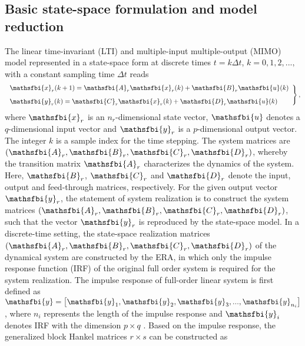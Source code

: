 \documentclass{jfm}
\begin{document}
\subsection{Basic state-space formulation and model reduction}
The linear time-invariant (LTI) and multiple-input multiple-output (MIMO) model represented in a state-space form 
at discrete times $t=k\Delta t$, 
$k=0,1,2,...,$ with a constant sampling time $\Delta t$ reads 
\begin{equation}
\left. \begin{array}{ll}

\displaystyle \mathsfbi{x}_{r}(k+1)=\mathsfbi{A}_{r}\mathsfbi{x}_{r}(k)+\mathsfbi{B}_{r}\mathsfbi{u}(k)  \\[8pt]

\displaystyle \mathsfbi{y}_{r}(k)=\mathsfbi{C}_{r}\mathsfbi{x}_{r}(k)+\mathsfbi{D}_{r}\mathsfbi{u}(k) 
\end{array}\right\},
 \label{eq:ERA_ROM}
\end{equation}  
where $\mathsfbi{x}_r$ is an $n_r$-dimensional state vector, 
$\mathsfbi{u}$ denotes a $q$-dimensional input vector 
and $\mathsfbi{y}_r$ is a $p$-dimensional output vector.  
The integer $k$ is a sample index for the time stepping.
%
The system matrices are $\left(\mathsfbi{A}_r,\mathsfbi{B}_r,\mathsfbi{C}_r,\mathsfbi{D}_r\right)$, 
whereby the transition matrix $\mathsfbi{A}_r$ characterizes the dynamics of the system.
Here, $\mathsfbi{B}_r$, 
$\mathsfbi{C}_r$ and $\mathsfbi{D}_r$ denote the input, output and 
feed-through matrices, respectively. 
For the given output vector $\mathsfbi{y}_r$, the statement of system realization 
is to construct the system matrices $\left(\mathsfbi{A}_r,\mathsfbi{B}_r,\mathsfbi{C}_r,\mathsfbi{D}_r \right)$,
such that the vector $\mathsfbi{y}_r$ is reproduced by the state-space model.
In a discrete-time setting,
the state-space realization matrices $\left(\mathsfbi{A}_{r},\mathsfbi{B}_{r},\mathsfbi{C}_{r},\mathsfbi{D}_{r} \right)$ 
of the dynamical system are constructed by the ERA, 
in which only the impulse response function (IRF) of the original full order system 
is required for the system realization. The impulse response of full-order linear system is 
first defined as 
$\mathsfbi{y}=\left[\mathsfbi{y}_1,\mathsfbi{y}_2,\mathsfbi{y}_3,...,\mathsfbi{y}_{n_i}\right]$, 
where $n_i$ represents the length of the impulse response 
and $\mathsfbi{y}_i$ denotes IRF with the dimension $p \times q$ . 
Based on the impulse response, the generalized block Hankel matrices $r\times s$  
can be constructed as
\end{document}
